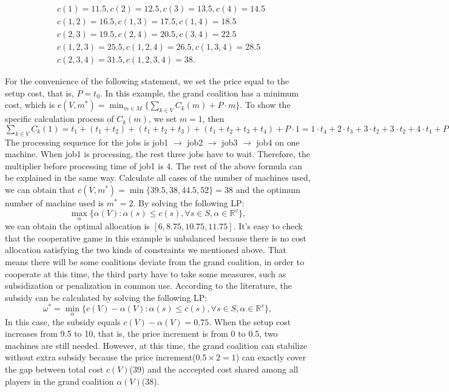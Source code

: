 \[
\begin{aligned}
& c({1}) = 11.5, c({2}) = 12.5, c({3}) = 13.5, c({4}) = 14.5  \\
& c({1,2}) = 16.5, c({1,3}) = 17.5, c({1,4}) = 18.5 \\
& c({2,3}) = 19.5, c({2,4}) = 20.5, c({3,4}) = 22.5 \\
& c({1,2,3}) = 25.5, c({1,2,4}) = 26.5, c({1,3,4}) = 28.5 \\
& c({2,3,4}) = 31.5, c({1,2,3,4}) = 38.
\end{aligned}
\]

For the convenience of the following statement, we set the price equal to the setup cost, that is, $P = t_0$.
In this example, the grand coalition has a minimum cost, which is $c(V,m^*) = \min_{m \in M} \{\sum_{k\in V}{C_k(m)}+ P\cdot m\}.$ To show the specific calculation process of $C_k(m)$, we set $m=1$, then $\sum_{k\in V}{C_k(1)} = t_1 + (t_1 + t_2) + (t_1 + t_2 + t_3) + (t_1 + t_2 + t_3 + t_4) + P\cdot 1 =
1 \cdot t_4 + 2\cdot t_3 + 3 \cdot t_2 + 3 \cdot t_2 + 4 \cdot t_1 + P \cdot 1.$
The processing sequence for the jobs is job1 $\to$ job2 $\to$ job3 $\to$ job4 on one machine. When job1 is processing, the rest three jobs have to wait. Therefore, the multiplier before processing time of job1 is $4$. The rest of the above formula can be explained in the same way.
Calculate all cases of the number of machines used, we can obtain that
$c(V,m^*) = \min\{39.5, 38, 44.5, 52\} = 38$ and the optimum number of machine used is $m^* = 2$.
By solving the following LP:
\[
  \mathop{\max}_{\alpha}\{\alpha(V): \alpha(s)\leq c(s),\forall s \in S, \alpha\in\mathbb{R}^{v}\},
\]
we can obtain the optimal allocation is $[6, 8.75, 10.75, 11.75]$.
It's easy to check that the cooperative game in this example is unbalanced because there is no cost allocation satisfying the two kinds of constraints we mentioned above. That means there will be some coalitions deviate from the grand coalition, in order to cooperate at this time, the third party have to take some measures, such as subsidization or penalization in common use.
According to the literature, the subsidy can be calculated by solving the following LP:
\[
  {\omega^*}=\mathop{\min}_{\alpha}\{c(V)-\alpha(V): \alpha(s)\leq c(s)
 ,\forall s \in S, \alpha\in\mathbb{R}^{v}\},
\]
In this case, the subsidy equals $c(V) - \alpha(V) = 0.75$.
When the setup cost increases from 9.5 to 10, that is, the price increment is from 0 to 0.5, two machines are still needed. However, at this time, the grand coalition can stabilize without extra subsidy because the price increment($0.5\times 2 =1$) can exactly cover the gap between total cost $c(V)$(39) and the acccepted cost shared among all players in the grand coalition $\alpha(V)$(38).

